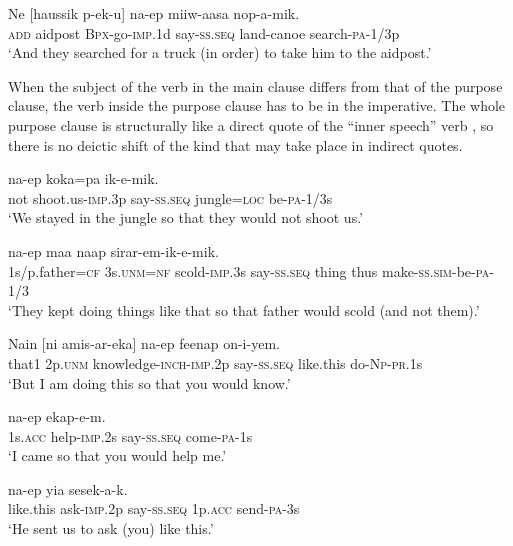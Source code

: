\ea%
\label{ex:8:x1620}
\gll Ne  [haussik  p-ek-u] na-ep miiw-aasa nop-a-mik.\\
\textsc{add} aidpost \textsc{Bpx}-go-\textsc{imp}.1d say-\textsc{ss}.\textsc{seq} land-canoe search-\textsc{pa}-1/3p\\
\glt`And they searched for a truck (in order) to take him to the aidpost.'
\z


When the subject of the verb in the main clause differs from that of the purpose clause, the verb inside the purpose clause has to be in the imperative. The whole purpose clause is structurally like a direct quote of the ``inner speech'' verb , so there is no deictic shift of the kind that may take place in indirect quotes.  

\ea%
\label{ex:8:x1062}
\gll [Me  yiar-uk]  na-ep  koka=pa  ik-e-mik. \\
not  shoot.us-\textsc{imp}.3p say-\textsc{ss}.\textsc{seq} jungle=\textsc{loc} be-\textsc{pa}-1/3s\\
\glt`We stayed in the jungle so that they would not shoot us.'
\z


\ea%
\label{ex:8:x346}
\gll [Auwa=ke  o=ko  amukar-inok]  na-ep  maa  naap sirar-em-ik-e-mik.\\
1s/p.father=\textsc{cf} 3s.\textsc{unm}=\textsc{nf} scold-\textsc{imp}.3s say-\textsc{ss}.\textsc{seq} thing thus make-\textsc{ss}.\textsc{sim}-be-\textsc{pa}-1/3\\
\glt`They kept doing things like that so that father would scold  (and not them).'
\z


\ea%
\label{ex:8:x1615}
\gll Nain  [ni  amis-ar-eka]  na-ep  feenap on-i-yem.\\
that1 2p.\textsc{unm} knowledge-\textsc{inch}-\textsc{imp}.2p  say-\textsc{ss}.\textsc{seq} like.this do-\textsc{Np}-\textsc{pr}.1s\\
\glt`But I am doing this so that you would know.'
\z


\ea%
\label{ex:8:x1617}
  na-ep  ekap-e-m. \\
1s.\textsc{acc} help-\textsc{imp}.2s say-\textsc{ss}.\textsc{seq} come-\textsc{pa}-1s\\
\glt`I came so that you would help me.'
\z


\ea%
\label{ex:8:x1618}
  na-ep  yia  sesek-a-k. \\
like.this  ask-\textsc{imp}.2p say-\textsc{ss}.\textsc{seq} 1p.\textsc{acc} send-\textsc{pa}-3s\\
\glt`He sent us to ask (you) like this.'
\z



